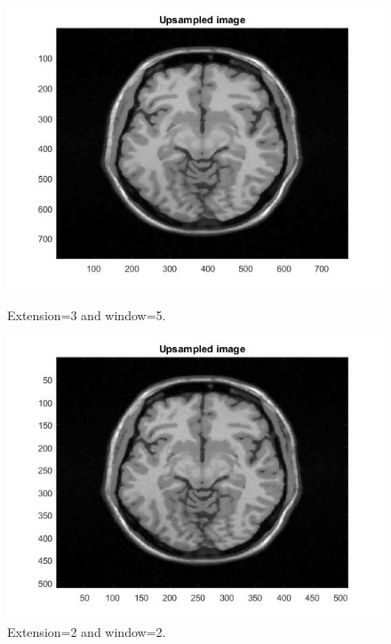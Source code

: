 \begin{itemize}
\begin{figure}[H]
\begin{minipage}{.5\textwidth}
  \centering
  \includegraphics[width=.7\linewidth]{figures/Module_10/Module10_6_w5}
 \caption{Extension=3 and window=5.}
  \label{fig: Module10_6_w5}
\end{minipage}%
\begin{minipage}{.5\textwidth}
  \centering
  \includegraphics[width=.7\linewidth]{figures/Module_10/Module10_7_w2}
 \caption{Extension=2 and window=2.}
  \label{fig: Module10_7_w2}
\end{minipage}
\end{figure}



\end{itemize}
